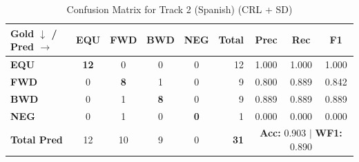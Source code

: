 \begin{table}[ht]
\centering
\small
\begin{tabular}{l|cccc|r|ccc}
\toprule
\textbf{Gold $\downarrow$ / Pred $\rightarrow$} & \textbf{EQU} & \textbf{FWD} & \textbf{BWD} & \textbf{NEG} & \textbf{Total} & \textbf{Prec} & \textbf{Rec} & \textbf{F1} \\
\midrule
\textbf{EQU} & \textbf{12} & 0 & 0 & 0 & 12 & 1.000 & 1.000 & 1.000 \\
\textbf{FWD} & 0 & \textbf{8} & 1 & 0 & 9 & 0.800 & 0.889 & 0.842 \\
\textbf{BWD} & 0 & 1 & \textbf{8} & 0 & 9 & 0.889 & 0.889 & 0.889 \\
\textbf{NEG} & 0 & 1 & 0 & \textbf{0} & 1 & 0.000 & 0.000 & 0.000 \\
\midrule
\textbf{Total Pred} & 12 & 10 & 9 & 0 & \textbf{31} & \multicolumn{3}{c}{\textbf{Acc:} 0.903 $\mid$ \textbf{WF1:} 0.890} \\
\bottomrule
\end{tabular}
\caption{Confusion Matrix for Track 2 (Spanish) (CRL + SD)}
\label{tab:confusion_matrix}
\end{table}
